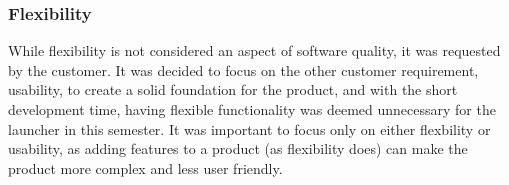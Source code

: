 \subsubsection{Flexibility}
While flexibility is not considered an aspect of software quality, it was requested by the customer. 
It was decided to focus on the other customer requirement, usability, to create a solid foundation for the product, and with the short development time, having flexible functionality was deemed unnecessary for the launcher in this semester. 
It was important to focus only on either flexbility or usability, as adding features to a product (as flexibility does) can make the product more complex and less user friendly. 